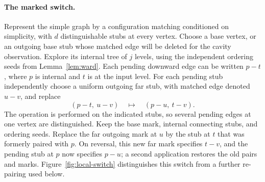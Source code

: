 \paragraph{The marked switch.}
Represent the simple graph by a configuration matching conditioned on
simplicity, with $d$ distinguishable stubs at every vertex.  Choose a
base vertex, or an outgoing base stub whose matched edge will be deleted
for the cavity observation.  Explore its internal tree of $j$ levels,
using the independent ordering seeds from Lemma~\ref{lem:ward}.
Each pending downward edge can be written $p-t$, where $p$ is internal
and $t$ is at the input level.  For each pending stub independently choose
a uniform outgoing far stub, with matched edge denoted $u-v$, and replace
\begin{equation}\label{eq:boundary-switch}
 (p-t,\ u-v)\quad\longmapsto\quad(p-u,\ t-v).
\end{equation}
The operation is performed on the indicated stubs, so several pending
edges at one vertex are distinguished.  Keep the base mark, internal
connecting stubs, and ordering seeds.  Replace the far outgoing mark at
$u$ by the stub at $t$ that was formerly paired with $p$.  On reversal,
this new far mark specifies $t-v$, and the pending stub at $p$ now
specifies $p-u$; a second application restores the old pairs and marks.
Figure~\ref{fig:local-switch} distinguishes this switch from a further
re-pairing used below.

